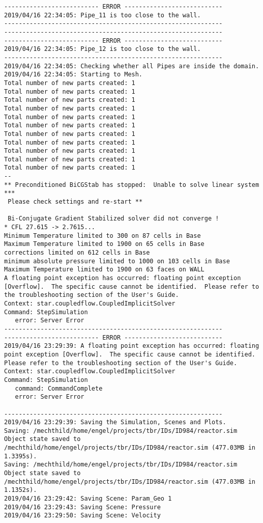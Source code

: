 \documentclass{article}
\begin{document}
{\begin{verbatim}
-------------------------- ERROR ---------------------------
2019/04/16 22:34:05: Pipe_11 is too close to the wall.
------------------------------------------------------------
------------------------------------------------------------
-------------------------- ERROR ---------------------------
2019/04/16 22:34:05: Pipe_12 is too close to the wall.
------------------------------------------------------------
2019/04/16 22:34:05: Checking whether all Pipes are inside the domain.
2019/04/16 22:34:05: Starting to Mesh.
Total number of new parts created: 1
Total number of new parts created: 1
Total number of new parts created: 1
Total number of new parts created: 1
Total number of new parts created: 1
Total number of new parts created: 1
Total number of new parts created: 1
Total number of new parts created: 1
Total number of new parts created: 1
Total number of new parts created: 1
Total number of new parts created: 1
--
** Preconditioned BiCGStab has stopped:  Unable to solve linear system *** 
 Please check settings and re-start ** 

 Bi-Conjugate Gradient Stabilized solver did not converge !
* CFL 27.615 -> 2.7615...
Minimum Temperature limited to 300 on 87 cells in Base
Maximum Temperature limited to 1900 on 65 cells in Base
corrections limited on 612 cells in Base
minimum absolute pressure limited to 1000 on 103 cells in Base
Maximum Temperature limited to 1900 on 63 faces on WALL
A floating point exception has occurred: floating point exception [Overflow].  The specific cause cannot be identified.  Please refer to the troubleshooting section of the User's Guide.
Context: star.coupledflow.CoupledImplicitSolver
Command: StepSimulation
   error: Server Error
------------------------------------------------------------
-------------------------- ERROR ---------------------------
2019/04/16 23:29:39: A floating point exception has occurred: floating point exception [Overflow].  The specific cause cannot be identified.  Please refer to the troubleshooting section of the User's Guide.
Context: star.coupledflow.CoupledImplicitSolver
Command: StepSimulation
   command: CommandComplete
   error: Server Error

------------------------------------------------------------
2019/04/16 23:29:39: Saving the Simulation, Scenes and Plots.
Saving: /mechthild/home/engel/projects/tbr/IDs/ID984/reactor.sim
Object state saved to /mechthild/home/engel/projects/tbr/IDs/ID984/reactor.sim (477.03MB in 1.3395s).
Saving: /mechthild/home/engel/projects/tbr/IDs/ID984/reactor.sim
Object state saved to /mechthild/home/engel/projects/tbr/IDs/ID984/reactor.sim (477.03MB in 1.1352s).
2019/04/16 23:29:42: Saving Scene: Param_Geo 1
2019/04/16 23:29:43: Saving Scene: Pressure
2019/04/16 23:29:50: Saving Scene: Velocity
\end{verbatim}
}
\clearpage
\end{document}
